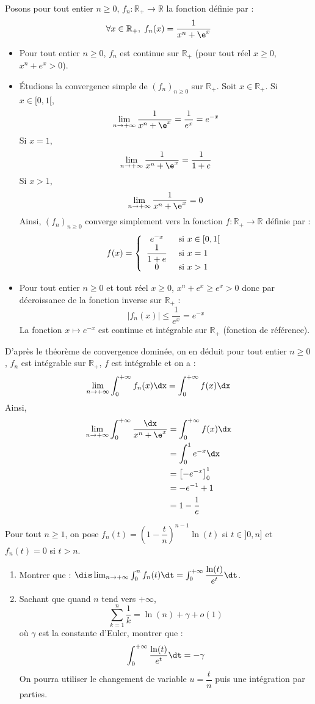 \documentclass[a4paper,10pt]{report}
\begin{document}
 \corr Posons pour tout entier $n \geq 0$, $f_n : \mathbb{R}_+ \rightarrow \mathbb{R}$ la fonction définie par :
 $$ \forall x \in \mathbb{R}_+, \; f_n(x) = \frac{1}{x^{n} + \e^{x}}$$
 
 \begin{itemize}
 \item Pour tout entier $n \geq 0$, $f_n$ est continue sur $\mathbb{R}_+$ (pour tout réel $x \geq 0$, $x^n+e^x>0$).
 \item Étudions la convergence simple de $(f_n)_{n \geq 0}$ sur $\mathbb{R}_+$. Soit $x \in \mathbb{R}_+$. Si $x \in [0,1[$,
 $$ \lim_{n \rightarrow + \infty} \frac{1}{x^{n} + \e^{x}} = \dfrac{1}{e^x} = e^{-x}$$
 Si $x=1$,
 $$ \lim_{n \rightarrow + \infty} \frac{1}{x^{n} + \e^{x}} = \dfrac{1}{1+e}$$
 Si $x>1$,
 $$  \lim_{n \rightarrow + \infty} \frac{1}{x^{n} + \e^{x}} = 0$$
 Ainsi, $(f_n)_{n \geq 0}$ converge simplement vers la fonction $f: \mathbb{R}_+ \rightarrow \mathbb{R}$ définie par :
 $$ f(x) = \left\lbrace \begin{array}{cl}
 e^{-x} & \hbox{ si } x \in [0,1[ \\
  \dfrac{1}{1+e} & \hbox{ si } x = 1 \\
  0 & \hbox{ si } x>1
 \end{array}\right.$$
 \item Pour tout entier $n \geq 0$ et tout réel $x \geq 0$, $x^n+e^x \geq e^x>0$ donc par décroissance de la fonction inverse sur $\mathbb{R}_+$ :
 $$ \vert f_n(x) \vert \leq \dfrac{1}{e^x}=e^{-x}$$
La fonction $x \mapsto e^{-x}$ est continue et intégrable sur $\mathbb{R}_+$ (fonction de référence).
 \end{itemize}
D'après le théorème de convergence dominée, on en déduit pour tout entier $n \geq 0$, $f_n$ est intégrable sur $\mathbb{R}_+$, $f$ est intégrable et on a :
$$ \lim_{n \rightarrow + \infty} \int_0^{+ \infty} f_n(x) \dx = \int_0^{+ \infty} f(x) \dx$$
Ainsi,
\begin{align*}
\lim_{n \rightarrow + \infty} \int_{0}^{ + \infty} \frac{\dx}{x^{n} + \e^{x}} & = \int_0^{+ \infty} f(x) \dx \\
& = \int_0^1 e^{-x} \dx \\
& = \left[ -e^{-x} \right]_0^1 \\
& = -e^{-1}+ 1 \\
& = 1 - \dfrac{1}{e}
\end{align*}

\begin{Exercice}{}
Pour tout $n \geq 1$, on pose $f_n(t) = \left( 1 - \dfrac{t}{n} \right)^{n-1}\ln(t)$ si $t \in ]0,n]$ et $f_n(t)=0$ si $t>n$.
\begin{enumerate}
\item Montrer que : $\dis \lim_{n \rightarrow + \infty} \int_{0}^n f_n(t) \dt = \int_{0}^{+ \infty} \dfrac{\ln(t)}{e^t} \dt$.
\item Sachant que quand $n$ tend vers $+ \infty$,
$$ \sum_{k=1}^n \dfrac{1}{k} = \ln(n)+ \gamma + o(1)$$
où $\gamma$ est la constante d'Euler, montrer que :
$$ \int_{0}^{+ \infty} \dfrac{\ln(t)}{e^t} \dt = - \gamma$$
On pourra utiliser le changement de variable $u=\dfrac{t}{n}$ puis une intégration par parties.
\end{enumerate}
\end{Exercice}
\end{document}
